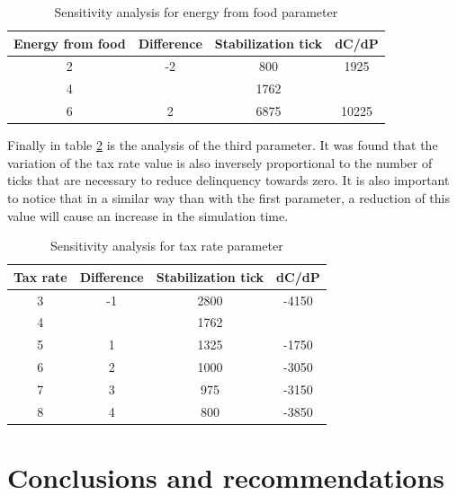 \documentclass{wscpaperproc}
\begin{document}
\begin{table}[h!]
    \centering
    \begin{tabular}{|c|c|c|c|}
        \hline
        Energy from food & Difference & Stabilization tick &  dC/dP\\
        \hline
        2 & -2 & 800 & 1925\\
        \hline
        \rowcolor{lightgray}
        4 &      & 1762 & \\
        \hline
        6 & 2  & 6875 & 10225\\
        \hline
    \end{tabular}
    \caption{Sensitivity analysis for energy from food parameter}
    \label{table:energy}
\end{table}

Finally in table \ref{table:taxes} is the analysis of the third parameter. It
was found that the variation of the tax rate value is also inversely
proportional to the number of ticks that are necessary to reduce delinquency
towards zero. It is also important to notice that in a similar way than with
the first parameter, a reduction of this value will cause an increase in the
simulation time.\\

\begin{table}[h!]
    \centering
    \begin{tabular}{|c|c|c|c|}
        \hline
        Tax rate & Difference & Stabilization tick &  dC/dP\\
        \hline
        3 & -1 & 2800 & -4150\\
        \hline
        \rowcolor{lightgray}
        4 &    & 1762 & \\
        \hline
        5 & 1  & 1325 & -1750\\
        \hline
        6 & 2  & 1000 & -3050\\
        \hline
        7 & 3  & 975  & -3150\\
        \hline
        8 & 4  & 800  & -3850\\
        \hline
    \end{tabular}
    \caption{Sensitivity analysis for tax rate parameter}
    \label{table:taxes}
\end{table}

\section{Conclusions and recommendations}
\end{document}
